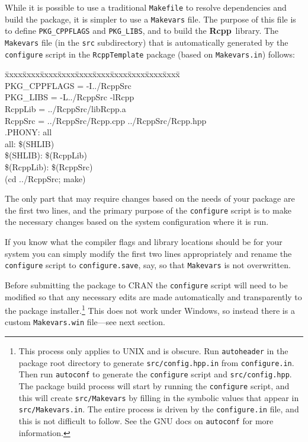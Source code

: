 \documentclass{article}
\newenvironment{program}{\ttfamily\begin{tabbing}
\=xxxx\=xxxx\=xxxx\=xxxx\=xxxx\=xxxx\=xxxx\=xxxx\=xxxx\=xxxx\= \+ \kill \\
}{\end{tabbing}}
\newcommand{\Rcpp}{{\bf Rcpp}}
\begin{document}
While it is possible to use a traditional {\tt Makefile} to resolve
dependencies and build the package, it is simpler to use a {\tt Makevars}
file. The purpose of this file is to define {\tt PKG\_CPPFLAGS} and
{\tt PKG\_LIBS}, and to build the \Rcpp\ library. The {\tt Makevars} file
(in the {\tt src} subdirectory)
that is automatically generated by the {\tt configure} script in the
{\tt RcppTemplate} package (based on {\tt Makevars.in}) follows:
\begin{program}
PKG\_CPPFLAGS = -I../RcppSrc\\
PKG\_LIBS = -L../RcppSrc -lRcpp\\
RcppLib = ../RcppSrc/libRcpp.a\\
RcppSrc = ../RcppSrc/Rcpp.cpp ../RcppSrc/Rcpp.hpp\\
.PHONY: all\\
all: \$(SHLIB)\\
\$(SHLIB): \$(RcppLib)\\
\$(RcppLib): \$(RcppSrc)\\
\>\> (cd ../RcppSrc; make)
\end{program}
The only part that may require changes based on the needs of your package
are the first two lines, and the
primary purpose of the {\tt configure} script is to make the
necessary changes based on the system configuration where it is run.

If you know what the compiler flags and library locations should be
for your system you can simply modify the first two lines
appropriately and rename the {\tt configure} script to
{\tt configure.save}, say, so that {\tt Makevars} is not overwritten.

Before submitting the package to CRAN the {\tt configure} script will
need to be modified so that any necessary edits are made automatically
and transparently to the package installer.\footnote{This process only
  applies to UNIX and is obscure. Run {\tt autoheader} in the package
  root directory to generate {\tt src/config.hpp.in} from
  {\tt configure.in}. Then run {\tt autoconf} to generate the
  {\tt configure} script and {\tt src/config.hpp}. The package build
  process will start by running the {\tt configure} script, and this
  will create {\tt src/Makevars} by filling in the symbolic values
  that appear in {\tt src/Makevars.in}. The entire process is driven
  by the {\tt configure.in} file, and this is not difficult to follow.
  See the GNU docs on {\tt autoconf} for more information.}
This does not work under
Windows, so instead there is a custom {\tt Makevars.win} file---see
next section.
\end{document}
